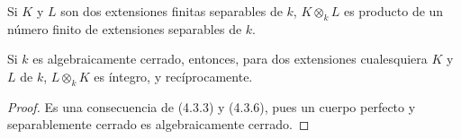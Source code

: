 \begin{corollary}[4.3.8]
\label{IV.2.4.3.8-fr}
Si $K$ y $L$ son dos extensiones finitas separables de $k$, $K\otimes_k L$ es
producto de un número finito de extensiones separables de $k$.
\end{corollary}


\begin{proposition}[4.3.9]
\label{IV.2.4.3.9-fr}
Si $k$ es algebraicamente cerrado, entonces, para dos extensiones cualesquiera
$K$ y $L$ de $k$, $L\otimes_k K$ es íntegro, y recíprocamente.
\end{proposition}

\begin{proof}
Es una consecuencia de (4.3.3) y (4.3.6), pues un cuerpo perfecto y
separablemente cerrado es algebraicamente cerrado.
\end{proof}

